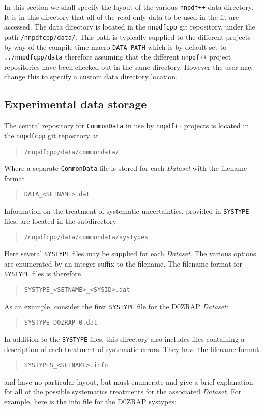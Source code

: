\documentclass[11pt]{article}
\begin{document}
In this section we shall specify the layout of the various {\tt nnpdf++} data directory. It is in this directory that all of the read-only data to be used in
the fit are accessed. The data directory is located in the {\tt nnpdfcpp} git repository, under the path {\tt /nnpdfcpp/data/}. This path is typically supplied to the different projects by way of the compile time macro {\tt DATA\_PATH} which is by default set to {\tt ../nnpdfcpp/data} therefore assuming that the different {\tt nnpdf++} project repositories have been checked out in the same directory. However the user may change this to specify a custom data directory location.
\subsection{Experimental data storage}
The central repository for {\tt CommonData} in use by {\tt nnpdf++} projects is located in the {\tt nnpdfcpp} git repository at
\begin{quotation}
    {\tt /nnpdfcpp/data/commondata/}
\end{quotation}
Where a separate {\tt CommonData} file is stored for each {\it Dataset} with the filename format
\begin{quotation}
	{\tt DATA\_<SETNAME>.dat }
\end{quotation}
Information on the treatment of systematic uncertainties, provided in {\tt SYSTYPE} files, are located in the subdirectory
\begin{quotation}
    {\tt /nnpdfcpp/data/commondata/systypes}
\end{quotation}
Here several {\tt SYSTYPE} files may be supplied for each {\it Dataset}. The various options are enumerated by an integer suffix to the filename. The filename format for {\tt SYSTYPE} files is therefore
\begin{quotation}
	{\tt SYSTYPE\_<SETNAME>\_<SYSID>.dat }
\end{quotation}
As an example, consider the first {\tt SYSTYPE} file for the D0ZRAP {\it Dataset}:
\begin{quotation}
	{\tt SYSTYPE\_D0ZRAP\_0.dat }
\end{quotation}
In addition to the {\tt SYSTYPE} files, this directory also includes files containing a description of each treatment of systematic errors. They have the filename format
\begin{quotation}
	{\tt SYSTYPES\_<SETNAME>.info }
\end{quotation}
and have no particular layout, but must enumerate and give a brief explanation for all of the possible systematics treatments for the associated {\it Dataset}. For example, here is the info file for the D0ZRAP systypes:
\end{document}
